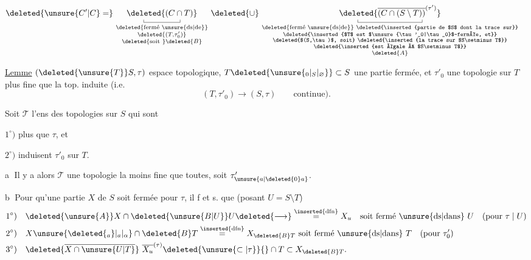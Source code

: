 \[
\begin{aligned}
 &\deleted{\unsure{C'|C}=}\ \underset{\substack{\text{\deleted{fermé \unsure{ds|de}}}\\\deleted{(T,\tau'_0)}\\\text{\deleted{soit }}\deleted{B}}}{\underset{\rule{.35pt}{.35em}\rule{4.4em}{.35pt}\rule{.35pt}{.35em}}{\deleted{(C\cap T)}}}
 \ \deleted{\cup}\ 
 \underset{\substack{\text{\deleted{fermé \unsure{ds|de}} \deleted{\inserted{partie de $S$ dont la trace sur}}}\\
 \text{\deleted{\inserted{$T$ est $\unsure{\tau'_0|\tau_0}$-fermée, et}}}\\
 \text{\deleted{$(S,\tau)$, soit} \deleted{\inserted{la trace sur $S\setminus T$}}}\\
 \text{\deleted{\inserted{est égale à $S\setminus T$}}}\\\deleted{A}}}{\underset{\rule{.35pt}{.35em}\rule{7.8em}{.35pt}\rule{.35pt}{.35em}}{\deleted{\overline{(C\cap(S\setminus T))}^{(\tau')}}}}
\end{aligned}
\]

\uline{Lemme}\quad {} $(\deleted{\unsure{T}}S,\tau)$ espace topologique, $T\deleted{\unsure{_0|_S|_{\varnothing}}}\subset S$ une partie fermée, et $\tau'_0$ une topologie  sur $T$ plus fine que la top. induite (i.e.
\[
 (T,\tau'_0)\mathbin{\longrightarrow}(S,\tau)\qquad\text{continue).}
\]


 Soit \uline{$\mathscr{T}$} l'ens des topologies sur $S$ qui sont

$1^\circ)$ plus  que $\tau$, et

$2^\circ)$ induisent $\tau'_0$ sur $T$.

\textcircled{a} Il y a alors  \uline{$\mathscr T$} une topologie la moins fine que toutes, soit $\tau'_{\unsure{a|\deleted{0}a}}$.

\textcircled{b} Pour qu'une partie $X$ de $S$ soit fermée pour $\tau$, il f et s. que (posant $U=S\setminus T$)
\[
\begin{aligned}
1^\circ)\quad &\deleted{\unsure{A}}X\cap \deleted{\unsure{B|U}}U\deleted{\longrightarrow}\overset{\inserted{\mathrm{dfn}}}{=}X_{u}\quad\text{soit fermé \unsure{ds|dans} }U\quad(\text{pour }\tau\mid U)\\
2^\circ)\quad &X\unsure{\deleted{_a}|_a|_\alpha}\cap\deleted{B}T\overset{\inserted{\mathrm{dfn}}}{=}X_{\deleted{B}T}\ \text{soit fermé \unsure{ds|dans} }T\quad(\text{pour }\tau'_0)\\
3^\circ)\quad &\deleted{\overline{X\cap\unsure{U|T}}}\ \overline{X_u}^{(\tau)}\deleted{\unsure{\subset|\tau}}{}\cap T\subset X_{\deleted{B}T}.
\end{aligned}
\]
